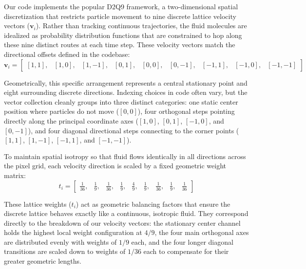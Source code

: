 \documentclass[11pt,a4paper]{article}
\begin{document}
Our code implements the popular D2Q9 framework, a two-dimensional spatial discretization that restricts particle movement to nine discrete lattice velocity vectors ($\mathbf{v}_i$). Rather than tracking continuous trajectories, the fluid molecules are idealized as probability distribution functions that are constrained to hop along these nine distinct routes at each time step. These velocity vectors match the directional offsets defined in the codebase:
\begin{equation}
\mathbf{v}_i = \begin{bmatrix}
[1,1], & [1,0], & [1,-1], & [0,1], & [0,0], & [0,-1], & [-1,1], & [-1,0], & [-1,-1]
\end{bmatrix}
\end{equation}

Geometrically, this specific arrangement represents a central stationary point and eight surrounding discrete directions. Indexing choices in code often vary, but the vector collection cleanly groups into three distinct categories: one static center position where particles do not move ($[0,0]$), four orthogonal steps pointing directly along the principal coordinate axes ($[1,0]$, $[0,1]$, $[-1,0]$, and $[0,-1]$), and four diagonal directional steps connecting to the corner points ($[1,1]$, $[1,-1]$, $[-1,1]$, and $[-1,-1]$). 

To maintain spatial isotropy so that fluid flows identically in all directions across the pixel grid, each velocity direction is scaled by a fixed geometric weight matrix:
\begin{equation}
t_i = \begin{bmatrix}
\frac{1}{36}, & \frac{1}{9}, & \frac{1}{36}, & \frac{1}{9}, & \frac{4}{9}, & \frac{1}{9}, & \frac{1}{36}, & \frac{1}{9}, & \frac{1}{36}
\end{bmatrix}
\end{equation}

These lattice weights ($t_i$) act as geometric balancing factors that ensure the discrete lattice behaves exactly like a continuous, isotropic fluid. They correspond directly to the breakdown of our velocity vectors: the stationary center channel holds the highest local weight configuration at $4/9$, the four main orthogonal axes are distributed evenly with weights of $1/9$ each, and the four longer diagonal transitions are scaled down to weights of $1/36$ each to compensate for their greater geometric lengths.
\end{document}
